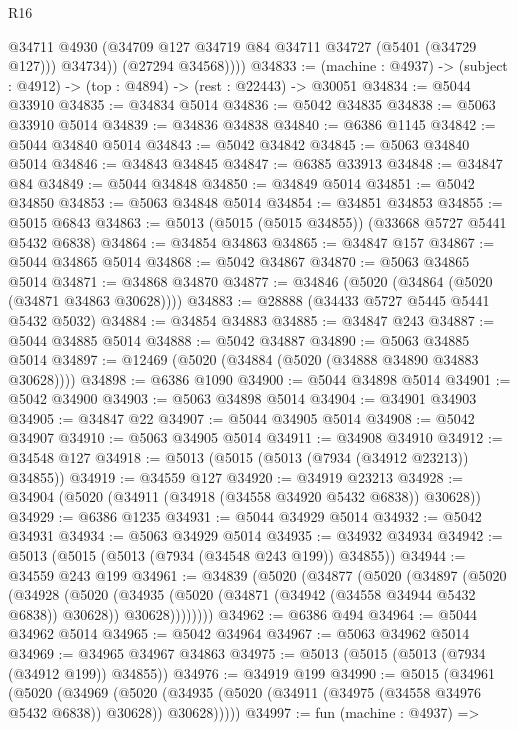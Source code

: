 \begin{lexlean}{R16}
\begin{coremodule}
              @34711
              @4930
              (@34709 @127 @34719 @84 @34711 @34727 (@5401 (@34729 @127)))
              @34734))
          (@27294 @34568))))
@34833 := (machine : @4937) -> (subject : @4912) -> (top : @4894) -> (rest : @22443) -> @30051
@34834 := @5044 @33910
@34835 := @34834 @5014
@34836 := @5042 @34835
@34838 := @5063 @33910 @5014
@34839 := @34836 @34838
@34840 := @6386 @1145
@34842 := @5044 @34840 @5014
@34843 := @5042 @34842
@34845 := @5063 @34840 @5014
@34846 := @34843 @34845
@34847 := @6385 @33913
@34848 := @34847 @84
@34849 := @5044 @34848
@34850 := @34849 @5014
@34851 := @5042 @34850
@34853 := @5063 @34848 @5014
@34854 := @34851 @34853
@34855 := @5015 @6843
@34863 := @5013 (@5015 (@5015 @34855)) (@33668 @5727 @5441 @5432 @6838)
@34864 := @34854 @34863
@34865 := @34847 @157
@34867 := @5044 @34865 @5014
@34868 := @5042 @34867
@34870 := @5063 @34865 @5014
@34871 := @34868 @34870
@34877 := @34846 (@5020 (@34864 (@5020 (@34871 @34863 @30628))))
@34883 := @28888 (@34433 @5727 @5445 @5441 @5432 @5032)
@34884 := @34854 @34883
@34885 := @34847 @243
@34887 := @5044 @34885 @5014
@34888 := @5042 @34887
@34890 := @5063 @34885 @5014
@34897 := @12469 (@5020 (@34884 (@5020 (@34888 @34890 @34883 @30628))))
@34898 := @6386 @1090
@34900 := @5044 @34898 @5014
@34901 := @5042 @34900
@34903 := @5063 @34898 @5014
@34904 := @34901 @34903
@34905 := @34847 @22
@34907 := @5044 @34905 @5014
@34908 := @5042 @34907
@34910 := @5063 @34905 @5014
@34911 := @34908 @34910
@34912 := @34548 @127
@34918 := @5013 (@5015 (@5013 (@7934 (@34912 @23213)) @34855))
@34919 := @34559 @127
@34920 := @34919 @23213
@34928 := @34904 (@5020 (@34911 (@34918 (@34558 @34920 @5432 @6838)) @30628))
@34929 := @6386 @1235
@34931 := @5044 @34929 @5014
@34932 := @5042 @34931
@34934 := @5063 @34929 @5014
@34935 := @34932 @34934
@34942 := @5013 (@5015 (@5013 (@7934 (@34548 @243 @199)) @34855))
@34944 := @34559 @243 @199
@34961 := @34839
    (@5020
      (@34877
        (@5020
          (@34897
            (@5020
              (@34928
                (@5020
                  (@34935
                    (@5020 (@34871 (@34942 (@34558 @34944 @5432 @6838)) @30628))
                    @30628))))))))
@34962 := @6386 @494
@34964 := @5044 @34962 @5014
@34965 := @5042 @34964
@34967 := @5063 @34962 @5014
@34969 := @34965 @34967 @34863
@34975 := @5013 (@5015 (@5013 (@7934 (@34912 @199)) @34855))
@34976 := @34919 @199
@34990 := @5015
    (@34961
      (@5020
        (@34969
          (@5020 (@34935 (@5020 (@34911 (@34975 (@34558 @34976 @5432 @6838)) @30628)) @30628)))))
@34997 := fun (machine : @4937) =>

\end{coremodule}
\end{lexlean}
